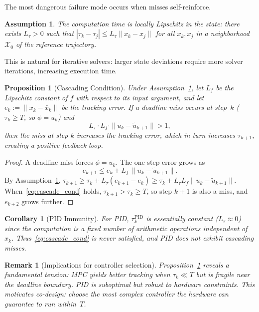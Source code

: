 \documentclass[conference]{IEEEtran}
\newcommand{\calX}{\mathcal{X}}
\newtheorem{proposition}{Proposition}
\newtheorem{corollary}{Corollary}
\newtheorem{remark}{Remark}
\newtheorem{assumption}{Assumption}
\begin{document}
The most dangerous failure mode occurs when misses self-reinforce.

\begin{assumption}\label{asm:tau_lipschitz}
  The computation time is locally Lipschitz in the state: there exists
  $L_\tau > 0$ such that
  $|\tau_k - \tau_j| \leq L_\tau \|x_k - x_j\|$ for all
  $x_k, x_j$ in a neighborhood $\calX_0$ of the reference trajectory.
\end{assumption}

This is natural for iterative solvers: larger state deviations require
more solver iterations, increasing execution time.

\begin{proposition}[Cascading Condition]\label{prop:cascade}
  Under Assumption~\ref{asm:tau_lipschitz}, let $L_f$ be the Lipschitz
  constant of $f$ with respect to its input argument, and let
  $e_{k} := \|x_{k} - \bar{x}_{k}\|$ be the tracking error.
  If a deadline miss occurs at step~$k$ ($\tau_k \geq T$, so
  $\phi = u_k$) and
  \begin{equation}\label{eq:cascade_cond}
    L_\tau \cdot L_f \cdot \|u_k - \tilde{u}_{k+1}\| > 1,
  \end{equation}
  then the miss at step $k$ increases the tracking error, which
  in turn increases $\tau_{k+1}$, creating a positive feedback loop.
\end{proposition}

\begin{proof}
  A deadline miss forces $\phi = u_k$.  The one-step error grows as
  \begin{equation*}
    e_{k+1} \leq e_k + L_f\,\|u_k - \tilde{u}_{k+1}\|.
  \end{equation*}
  By Assumption~\ref{asm:tau_lipschitz},
  $\tau_{k+1} \geq \tau_k + L_\tau(e_{k+1} - e_k)
  \geq \tau_k + L_\tau L_f \|u_k - \tilde{u}_{k+1}\|$.
  When~\eqref{eq:cascade_cond} holds,
  $\tau_{k+1} > \tau_k \geq T$, so step $k{+}1$ is also a miss,
  and $e_{k+2}$ grows further.
\end{proof}

\begin{corollary}[PID Immunity]\label{cor:pid}
  For PID, $\tau_k^{\mathrm{PID}}$ is essentially constant
  ($L_\tau \approx 0$) since the computation is a fixed number of
  arithmetic operations independent of $x_k$.
  Thus~\eqref{eq:cascade_cond} is never satisfied, and PID does not
  exhibit cascading misses.
\end{corollary}

\begin{remark}[Implications for controller selection]
  Proposition~\ref{prop:cascade} reveals a fundamental tension:
  MPC yields better tracking when $\tau_k \ll T$ but is \emph{fragile}
  near the deadline boundary.  PID is suboptimal but \emph{robust}
  to hardware constraints.  This motivates co-design: choose the most
  complex controller the hardware can guarantee to run within~$T$.
\end{remark}
\end{document}
